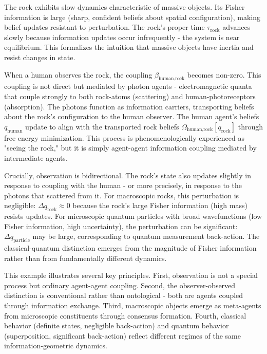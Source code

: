 \documentclass[11pt]{article}
\begin{document}
The rock exhibits slow dynamics characteristic of massive objects. Its Fisher information is large (sharp, confident beliefs about spatial configuration), making belief updates resistant to perturbation. The rock's proper time $\tau_{\text{rock}}$ advances slowly because information updates occur infrequently - the system is near equilibrium. This formalizes the intuition that massive objects have inertia and resist changes in state.

When a human observes the rock, the coupling $\beta_{\text{human,rock}}$ becomes non-zero. This coupling is not direct but mediated by photon agents - electromagnetic quanta that couple strongly to both rock-atoms (scattering) and human-photoreceptors (absorption). The photons function as information carriers, transporting beliefs about the rock's configuration to the human observer. The human agent's beliefs $q_{\text{human}}$ update to align with the transported rock beliefs $\Omega_{\text{human,rock}}[q_{\text{rock}}]$ through free energy minimization. This process is phenomenologically experienced as "seeing the rock," but it is simply agent-agent information coupling mediated by intermediate agents.

Crucially, observation is bidirectional. The rock's state also updates slightly in response to coupling with the human - or more precisely, in response to the photons that scattered from it. For macroscopic rocks, this perturbation is negligible: $\Delta q_{\text{rock}} \approx 0$ because the rock's large Fisher information (high mass) resists updates. For microscopic quantum particles with broad wavefunctions (low Fisher information, high uncertainty), the perturbation can be significant: $\Delta q_{\text{particle}}$ may be large, corresponding to quantum measurement back-action. The classical-quantum distinction emerges from the magnitude of Fisher information rather than from fundamentally different dynamics.

This example illustrates several key principles. First, observation is not a special process but ordinary agent-agent coupling. Second, the observer-observed distinction is conventional rather than ontological - both are agents coupled through information exchange. Third, macroscopic objects emerge as meta-agents from microscopic constituents through consensus formation. Fourth, classical behavior (definite states, negligible back-action) and quantum behavior (superposition, significant back-action) reflect different regimes of the same information-geometric dynamics.
\end{document}
